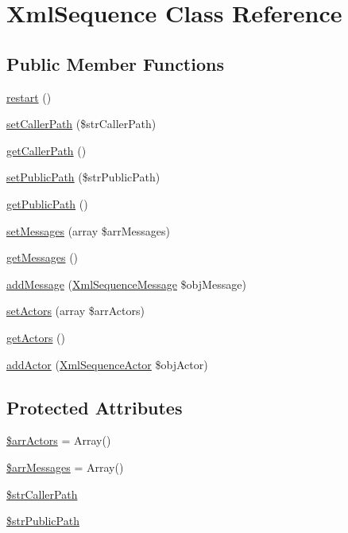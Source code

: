 \hypertarget{class_xml_sequence}{
\section{XmlSequence Class Reference}
\label{class_xml_sequence}
}
\subsection*{Public Member Functions}
\begin{CompactItemize}
\item 
\hyperlink{class_xml_sequence_c8de9e38ce27c87f710dff42a13455cf}{restart} ()
\item 
\hyperlink{class_xml_sequence_bdded6991e674ce82f04f701972ebf9f}{setCallerPath} (\$strCallerPath)
\item 
\hyperlink{class_xml_sequence_a8c839c9d33ebad153541a31ffc7ef3e}{getCallerPath} ()
\item 
\hyperlink{class_xml_sequence_261f2bb173e655f2ead64eda4c29e76a}{setPublicPath} (\$strPublicPath)
\item 
\hyperlink{class_xml_sequence_74df99a19bc54d630a15e1778144eb31}{getPublicPath} ()
\item 
\hyperlink{class_xml_sequence_f0c179f1eb00eaaafb9d18f7a330b86f}{setMessages} (array \$arrMessages)
\item 
\hyperlink{class_xml_sequence_7347b0b89cca1d7604e93f5b5e896fc4}{getMessages} ()
\item 
\hyperlink{class_xml_sequence_a93046205800334868fc8aa3294a609e}{addMessage} (\hyperlink{class_xml_sequence_message}{XmlSequenceMessage} \$objMessage)
\item 
\hyperlink{class_xml_sequence_3ffb44470b89a8f309c8e18159bdac24}{setActors} (array \$arrActors)
\item 
\hyperlink{class_xml_sequence_c5620e43921e5f05c953d7afd78b6bcd}{getActors} ()
\item 
\hyperlink{class_xml_sequence_74d90b5972a5dfb4ce6d4ea96c2b3ea2}{addActor} (\hyperlink{class_xml_sequence_actor}{XmlSequenceActor} \$objActor)
\end{CompactItemize}
\subsection*{Protected Attributes}
\begin{CompactItemize}
\item 
\hyperlink{class_xml_sequence_51bd2c8dc9510ff43aaf11f3129bea0f}{\$arrActors} = Array()
\item 
\hyperlink{class_xml_sequence_bc2745674d501af3a6d23b496ad9fd05}{\$arrMessages} = Array()
\item 
\hyperlink{class_xml_sequence_80901f2e74e755896ca3914ff039dab9}{\$strCallerPath}
\item 
\hyperlink{class_xml_sequence_5fa653f11488edb1d638093f347807f5}{\$strPublicPath}
\end{CompactItemize}


